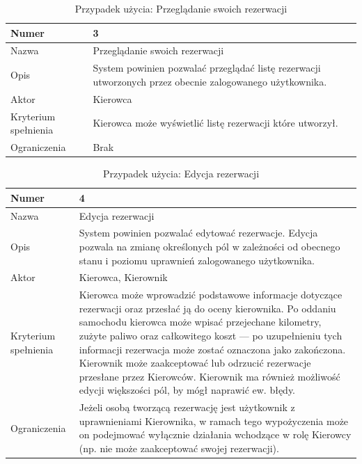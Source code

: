\documentclass[eng,printmode,openany]{mgr}
\begin{document}
	\begin{table}[H]
		\caption{Przypadek użycia: Przeglądanie swoich rezerwacji}
		\begin{tabularx}{\textwidth}{|l|X|}
			\hline
			Numer                & 3  \\ \hline
			Nazwa                & Przeglądanie swoich rezerwacji \\ \hline
			Opis                 & System powinien pozwalać przeglądać listę rezerwacji utworzonych przez obecnie zalogowanego użytkownika. \\ \hline
			Aktor                & Kierowca \\ \hline
			Kryterium spełnienia & Kierowca może wyświetlić listę rezerwacji które utworzył. \\ \hline
			Ograniczenia         & Brak  \\ \hline
		\end{tabularx}
	\end{table}
	
	\begin{table}[H]
		\caption{Przypadek użycia: Edycja rezerwacji}
		\begin{tabularx}{\textwidth}{|l|X|}
			\hline
			Numer                & 4  \\ \hline
			Nazwa                & Edycja rezerwacji\\ \hline
			Opis                 & System powinien pozwalać edytować rezerwacje. Edycja pozwala na zmianę określonych pól w zależności od obecnego stanu i poziomu uprawnień zalogowanego użytkownika. \\ \hline
			Aktor                & Kierowca, Kierownik \\ \hline
			Kryterium spełnienia & Kierowca może wprowadzić podstawowe informacje dotyczące rezerwacji oraz przesłać ją do oceny kierownika. Po oddaniu samochodu kierowca może wpisać przejechane kilometry, zużyte paliwo oraz całkowitego koszt — po uzupełnieniu tych informacji rezerwacja może zostać oznaczona jako zakończona. Kierownik może zaakceptować lub odrzucić rezerwacje przesłane przez Kierowców. Kierownik ma również możliwość edycji większości pól, by mógł naprawić ew. błędy. \\ \hline
			Ograniczenia         & Jeżeli osobą tworzącą rezerwację jest użytkownik z uprawnieniami Kierownika, w ramach tego wypożyczenia może on podejmować wyłącznie działania wchodzące w rolę Kierowcy (np. nie może zaakceptować swojej rezerwacji). \\ \hline
		\end{tabularx}
	\end{table}
	
\end{document}

